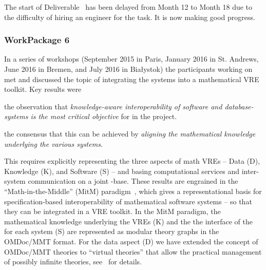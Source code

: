 \documentclass{deliverablereport}
\begin{document}
  The start of Deliverable~ has been delayed from Month 12 to
  Month 18 due to the difficulty of hiring an engineer for the task.  It is now making
  good progress.

  \paragraph{}

  

  
  \subsubsection{WorkPackage 6}
  In a series of workshops (September 2015 in Paris, January 2016 in St. Andrews, June
  2016 in Bremen, and July 2016 in Bia{\l}ystok) the participants working on
   met and discussed the topic of integrating the \pn systems into a
  mathematical VRE toolkit.  Key results were
  \begin{compactitem}[\bf R1.]
  \item the observation that \emph{knowledge-aware interoperability of software and
      database-systems is the most critical objective} for  in the \pn
    project.
  \item the consensus that this can be achieved by \emph{aligning the mathematical
      knowledge underlying the various systems}.
  \end{compactitem}
  This requires explicitly representing the three aspects of math VREs -- Data (D),
  Knowledge (K), and Software (S) -- and basing computational services and inter-system
  communication on a joint \DKS-base. These results are engrained in the
  ``Math-in-the-Middle'' (MitM) paradigm~\cite{DehKohKon:iop16}, which gives a
  representational basis for specification-based interoperability of mathematical software
  systems -- so that they can be integrated in a VRE toolkit. In the MitM paradigm, the
  mathematical knowledge underlying the VREs (K) and the the interface of the for each
  system (S) are represented as modular theory graphs in the OMDoc/MMT format. For the
  data aspect (D) we have extended the concept of OMDoc/MMT theories to ``virtual
  theories'' that allow the practical management of possibly infinite theories,
  see~\cite{ODK-D6.2} for details.
\end{document}
